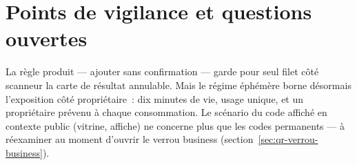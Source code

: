\chapter{Points de vigilance et questions ouvertes}

\begin{alerte}
La règle produit --- ajouter sans confirmation --- garde pour seul filet côté scanneur
la carte de résultat annulable. Mais le régime éphémère borne désormais l'exposition
côté propriétaire~: dix minutes de vie, usage unique, et un propriétaire prévenu à
chaque consommation. Le scénario du code affiché en contexte public (vitrine, affiche)
ne concerne plus que les codes permanents --- à réexaminer au moment d'ouvrir le verrou
business (section~\ref{sec:qr-verrou-business}).
\end{alerte}


